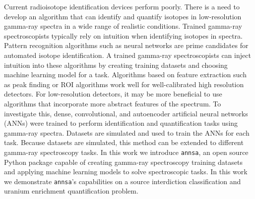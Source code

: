 Current radioisotope identification devices perform poorly. There is a need to develop an algorithm that can identify and quantify isotopes in low-resolution gamma-ray spectra in a wide range of realistic conditions. Trained gamma-ray spectroscopists typically rely on intuition when identifying isotopes in spectra. Pattern recognition algorithms such as neural networks are prime candidates for automated isotope identification. A trained gamma-ray spectroscopists can inject intuition into these algorithms by creating training datasets and choosing machine learning model for a task. Algorithms based on feature extraction such as peak finding or ROI algorithms work well for well-calibrated high resolution detectors. For low-resolution detectors, it may be more beneficial to use algorithms that incorporate more abstract features of the spectrum. To investigate this, dense, convolutional, and autoencoder artificial neural networks (ANNs) were trained to perform identification and quantification tasks using gamma-ray spectra. Datasets are simulated and used to train the ANNs for each task. Because datasets are simulated, this method can be extended to different gamma-ray spectroscopy tasks. In this work we introduce \verb|annsa|, an open source Python package capable of creating gamma-ray spectroscopy training datasets and applying machine learning models to solve spectroscopic tasks. In this work we demonstrate \verb|annsa|'s capabilities on a source interdiction classification and uranium enrichment quantification problem.